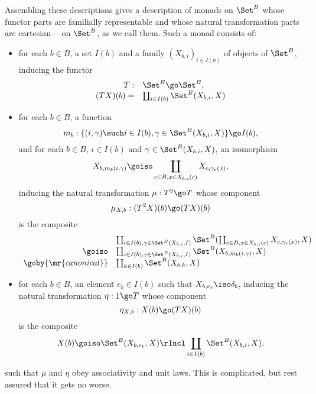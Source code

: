 Assembling these descriptions gives a description of monads on $\Set^B$
whose functor parts are familially representable and whose natural
transformation parts are cartesian---%
%
%
%
%
on $\Set^B$, as we call them.  Such a monad consists of:
%
\begin{itemize}
\item for each $b\in B$, a set $I(b)$ and a family $(X_{b,i})_{i\in I(b)}$
of objects of $\Set^B$, inducing the functor
\[
\begin{array}{rl}
T: 		&\Set^B \go \Set^B,		\\
(TX)(b) = 	&\coprod_{i\in I(b)} \Set^B (X_{b,i}, X)
\end{array}
\]
\item for each $b\in B$, a function
\[
m_b: 
\{(i,\gamma) \such i\in I(b), \gamma\in \Set^B (X_{b,i}, X) \}
\go
I(b),
\]
and for each $b\in B$, $i\in I(b)$ and $\gamma\in\Set^B (X_{b,i}, X)$, an
isomorphism 
\[
X_{b, m_b(i,\gamma)} 
\goiso
\coprod_{c\in B, x\in X_{b,i}(c)} X_{c,\gamma_c(x)},
\]
inducing the natural transformation $\mu: T^2 \go T$ whose component
\[
\mu_{X,b}: (T^2 X)(b) \go (TX)(b)
\]
is the composite
\[
\begin{array}{rl}
	&
\coprod_{i\in I(b), \gamma\in \Set^B (X_{b,i}, I)}
\Set^B (\coprod_{c\in B, x\in X_{b,i}(c)} X_{c,\gamma_c(x)}, X)	\\
\goiso	&
\coprod_{i\in I(b), \gamma\in \Set^B (X_{b,i}, I)}
\Set^B (X_{b, m_b(i,\gamma)}, X)				\\
\goby{\mr{canonical}}	&
\coprod_{k\in I(b)} \Set^B (X_{b,k}, X)
\end{array}
\]
\item for each $b\in B$, an element $e_b \in I(b)$ such that $X_{b, e_b}
\iso \delta_b$, inducing the natural transformation $\eta: 1 \go T$ whose
component
\[
\eta_{X,b}: X(b) \go (TX)(b)
\]
is the composite
\[
X(b) 
\goiso 
\Set^B (X_{b,e_b}, X)
\rIncl
\coprod_{i\in I(b)} \Set^B (X_{b,i}, X),
\]
\end{itemize}
%
such that $\mu$ and $\eta$ obey associativity and unit laws.  This is
complicated, but rest assured that it gets no worse.

